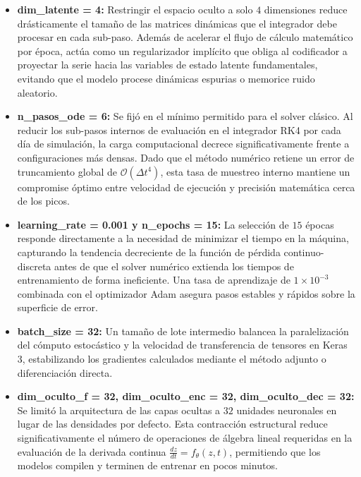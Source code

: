 \documentclass[11pt,a4paper]{article}
\begin{document}
\begin{itemize}
    \item \textbf{dim\_latente = 4:} Restringir el espacio oculto a solo $4$ dimensiones reduce drásticamente el tamaño de las matrices dinámicas que el integrador debe procesar en cada sub-paso. Además de acelerar el flujo de cálculo matemático por época, actúa como un regularizador implícito que obliga al codificador a proyectar la serie hacia las variables de estado latente fundamentales, evitando que el modelo procese dinámicas espurias o memorice ruido aleatorio.
    \item \textbf{n\_pasos\_ode = 6:} Se fijó en el mínimo permitido para el solver clásico. Al reducir los sub-pasos internos de evaluación en el integrador RK4 por cada día de simulación, la carga computacional decrece significativamente frente a configuraciones más densas. Dado que el método numérico retiene un error de truncamiento global de $\mathcal{O}(\Delta t^4)$, esta tasa de muestreo interno mantiene un compromise óptimo entre velocidad de ejecución y precisión matemática cerca de los picos.
    \item \textbf{learning\_rate = 0.001 y n\_epochs = 15:} La selección de $15$ épocas responde directamente a la necesidad de minimizar el tiempo en la máquina, capturando la tendencia decreciente de la función de pérdida continuo-discreta antes de que el solver numérico extienda los tiempos de entrenamiento de forma ineficiente. Una tasa de aprendizaje de $1\times 10^{-3}$ combinada con el optimizador Adam asegura pasos estables y rápidos sobre la superficie de error.
    \item \textbf{batch\_size = 32:} Un tamaño de lote intermedio balancea la paralelización del cómputo estocástico y la velocidad de transferencia de tensores en Keras 3, estabilizando los gradientes calculados mediante el método adjunto o diferenciación directa.
    \item \textbf{dim\_oculto\_f = 32, dim\_oculto\_enc = 32, dim\_oculto\_dec = 32:} Se limitó la arquitectura de las capas ocultas a $32$ unidades neuronales en lugar de las densidades por defecto. Esta contracción estructural reduce significativamente el número de operaciones de álgebra lineal requeridas en la evaluación de la derivada continua $\frac{dz}{dt} = f_\theta(z, t)$, permitiendo que los modelos compilen y terminen de entrenar en pocos minutos.
\end{itemize}
\end{document}
